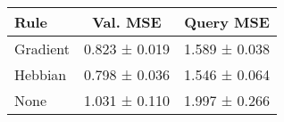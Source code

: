 \begin{tabular}{lcc}
\toprule
Rule & Val. MSE & Query MSE \\
\midrule
Gradient & 0.823 ± 0.019 & 1.589 ± 0.038 \\
Hebbian & 0.798 ± 0.036 & 1.546 ± 0.064 \\
None & 1.031 ± 0.110 & 1.997 ± 0.266 \\
\bottomrule
\end{tabular}
